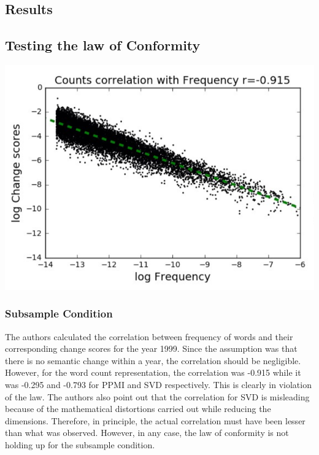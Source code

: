\documentclass[a0,landscape]{a0poster}
\begin{document}
\begin{multicols}{4}

\section*{Results}
\subsection*{Testing the law of Conformity} 

\begin{center}\vspace{1cm}
  \includegraphics[width=0.8\linewidth]{image2.png}
\end{center}\vspace{1cm}

\subsubsection*{Subsample Condition} 
The authors calculated the correlation between frequency of words and their corresponding change scores for the year 1999. Since the assumption was that there is no semantic change within a year, the correlation should be negligible. However, for the word count representation, the correlation was -0.915 while it was -0.295 and -0.793 for PPMI and SVD respectively. This is clearly in violation of the law. The authors also point out that the correlation for SVD is misleading because of the mathematical distortions carried out while reducing the dimensions. Therefore, in principle, the actual correlation must have been lesser than what was observed. However, in any case, the law of conformity is not holding up for the subsample condition.


\end{multicols}
\end{document}
